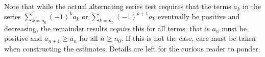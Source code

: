 \documentclass{ximera}
\begin{document}

\begin{remark}
Note that while the actual alternating series test requires that the terms $a_k$ in the series $\sum_{k=n_0} (-1)^k a_k$ or $\sum_{k=n_0} (-1)^{k+1} a_k$ eventually be positive and decreasing, the remainder results \emph{require} this for all terms; that is $a_n$ must be positive and $a_{n+1} \geq a_n$ for all $n \geq n_0$.  If this is not the case, care must be taken when constructing the estimates.  Details are left for the curious reader to ponder.
\end{remark}



%
%
%
%
%        
%  
%  
%  
%  
\end{document}
